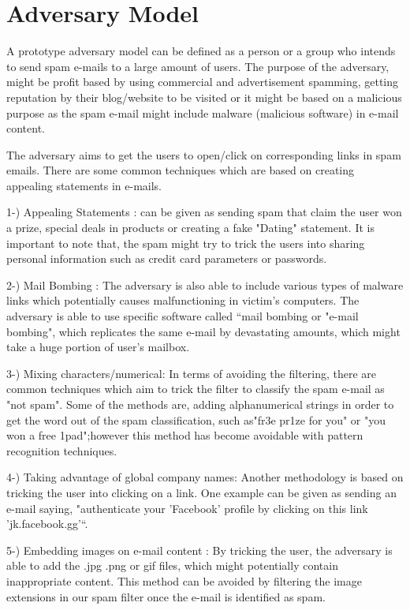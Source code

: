 \section{Adversary Model}
                    

A prototype adversary model can be defined as a person or a group who intends to send spam e-mails to a large amount of users. The purpose of the adversary, might be profit based by using commercial and advertisement spamming, getting reputation by their blog/website to be visited or it might be based on a malicious purpose as the spam e-mail might include malware (malicious software) in e-mail content. 

The adversary aims to get the users to open/click on corresponding links in spam emails. There are some common techniques which are based on creating appealing statements in e-mails. 

1-) Appealing Statements : can be given as sending spam that claim the user won a prize, special deals in products or creating a fake "Dating" statement. It is important to note that, the spam might try to trick the users into sharing personal information such as credit card parameters or passwords.

2-) Mail Bombing : The adversary is also able to include various types of malware links which potentially causes malfunctioning in victim's computers. The adversary is able to use specific software called “mail bombing or "e-mail bombing", which replicates the same e-mail by devastating amounts, which might take a huge portion of user's mailbox. 

3-) Mixing characters/numerical: In terms of avoiding the filtering, there are common techniques which aim to trick the filter to classify the spam e-mail as "not spam". Some of the methods are, adding alphanumerical strings in order to get the word out of the spam classification, such as"fr3e pr1ze for you" or "you won a free 1pad";however this method has become avoidable with pattern recognition techniques.

4-) Taking advantage of global company names: Another methodology is based on tricking the user into clicking on a link. One example can be given as sending an e-mail saying, "authenticate your 'Facebook' profile by clicking on this link 'jk.facebook.gg'``.

5-) Embedding images on e-mail content : By tricking the user, the adversary is able to add the .jpg .png or gif files, which might potentially contain inappropriate content. This method can be avoided by filtering the image extensions in  our spam filter once the e-mail is identified as spam.


